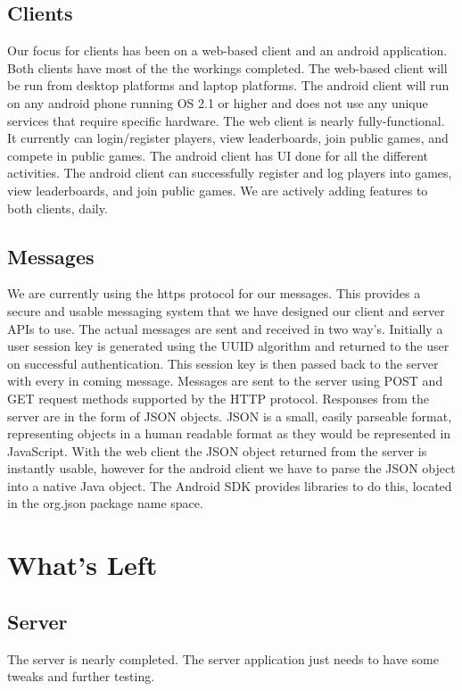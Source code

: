 \documentclass{dependencies/acm_proc_article-sp}
\begin{document}
\subsection {Clients}
Our focus for clients has been on a web-based client and an android application.
Both clients have most of the the workings completed. The web-based client will
be run from desktop platforms and laptop platforms. The android client will run
on any android phone running OS 2.1 or higher and does not use any unique services that require specific
hardware. The web client is nearly fully-functional. It currently can login/register
players, view leaderboards, join public games, and compete in public games. The android client has UI done for all the different activities. The android client can successfully register
and log players into games, view leaderboards, and join public games. We are actively adding features to both clients, daily.

\subsection {Messages}
We are currently using the https protocol for our messages. This provides a secure
and usable messaging system that we have designed our client and server APIs to use.
The actual messages are sent and received in two way's. Initially a user session key is
generated using the UUID \cite{uuid} algorithm and returned to the user on successful
authentication. This session key is then passed back to the server with every in coming
message. Messages are sent to the server using POST and GET request methods supported
by the HTTP protocol. Responses from the server are in the form of JSON \cite{json} objects.
JSON is a small, easily parseable format, representing objects in a human readable format as
they would be represented in JavaScript. With the web client the JSON object returned from
the server is instantly usable, however for the android client we have to parse the JSON object
into a native Java object. The Android SDK provides libraries to do this, located in the
org.json \cite{orgjson} package name space.



\section {What's Left}
\subsection {Server}
The server is nearly completed. The server application just needs to have some tweaks and further testing.
\end{document}
